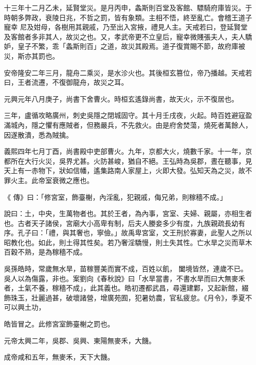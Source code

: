 \begin{pinyinscope}
 十三年十二月乙未，延賢堂災。是月丙申，螽斯則百堂及客館、驃騎府庫皆災。于時朝多弊政，衰陵日兆，不哲之罰，皆有象類。主相不悟，終至亂亡。會稽王道子寵幸
 尼及姏母，各樹用其親戚，乃至出入宮掖，禮見人主。天戒若曰，登延賢堂及客館者多非其人，故災之也。又，孝武帝更不立皇后，寵幸微賤張夫人，夫人驕妒，皇子不繁，乖「螽斯則百」之道，故災其殿焉。道子復賞賜不節，故府庫被災，斯亦其罰也。



 安帝隆安二年三月，龍舟二乘災，是水沴火也。其後桓玄篡位，帝乃播越。天戒若曰，王者流遷，不復御龍舟，故災之耳。



 元興元年八月庚子，尚書下舍曹火。時桓玄遙錄尚書，故天火，示不復居也。



 三年，盧循攻略廣州，刺史吳隱之閉城固守。其十月壬戌夜，火起。時百姓避寇盈滿城內，隱之懼有應賊者，但務嚴兵，不先救火。由是府舍焚蕩，燒死者萬餘人，因遂散潰，悉為賊擒。



 義熙四年七月丁酉，尚書殿中吏部曹火。九年，京都大火，燒數千家。十一年，京都所在大行火災，吳界尤甚。火防甚峻，猶自不絕。王弘時為吳郡，晝在聽事，見天上有一赤物下，狀如信幡，遙集路南人家屋上，火即大發。弘知天為之災，故不罪火主。此帝室衰微之應也。



 《
 傳》曰：「修宮室，飾臺榭，內淫亂，犯親戚，侮兄弟，則稼穡不成。」



 說曰：土，中央，生萬物者也。其於王者，為內事，宮室、夫婦、親屬，亦相生者也。古者天子諸侯，宮廟大小高卑有制，后夫人媵妾多少有度，九族親疏長幼有序。孔子曰：「禮，與其奢也，寧儉。」故禹卑宮室，文王刑於寡妻，此聖人之所以昭教化也。如此，則土得其性矣。若乃奢淫驕慢，則土失其性。亡水旱之災而草木百穀不熟，是為稼穡不成。



 吳孫皓時，常歲無水旱，苗稼豐美而實不成，百姓以飢，
 闔境皆然，連歲不已。吳人以為傷露，非也。案劉向《春秋說》曰「水旱當書，不書水旱而曰大無麥禾者，土氣不養，稼穡不成」，此其義也。皓初遷都武昌，尋還建鄴，又起新館，綴飾珠玉，壯麗過甚，破壞諸營，增廣苑囿，犯暑妨農，官私疲怠。《月令》，季夏不可以興土功，



 皓皆冒之。此修宮室飾臺榭之罰也。



 元帝太興二年，吳郡、吳興、東陽無麥禾，大饑。



 成帝咸和五年，無麥禾，天下大饑。




\end{pinyinscope}
